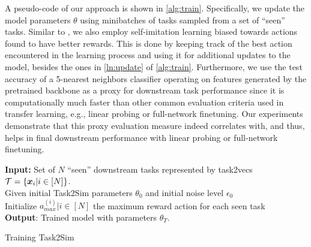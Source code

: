 A pseudo-code of our approach is shown in \cref{alg:train}.  Specifically, we update the model parameters $\theta$ using minibatches of tasks sampled from a set of ``seen'' tasks. Similar to \cite{oh2018self}, we also employ self-imitation learning biased towards actions found to have better rewards. This is done by keeping track of the best action encountered in the learning process and using it for additional updates to the model, besides the ones in \cref{ln:update} of \cref{alg:train}. 
Furthermore, we use the test accuracy of a 5-nearest neighbors classifier operating on features generated by the pretrained backbone as a proxy for downstream task performance since it is computationally much faster than other common evaluation criteria used in transfer learning, e.g., linear probing or full-network finetuning. Our experiments demonstrate that this proxy evaluation measure indeed correlates with, and thus, helps in final downstream performance with linear probing or full-network finetuning. 






\begin{algorithm}
\DontPrintSemicolon
 \textbf{Input:} Set of $N$ ``seen'' downstream tasks represented by task2vecs $\mathcal{T} = \{\boldsymbol{x}_i | i \in [N]\}$. \\
 Given initial Task2Sim parameters $\theta_0$ and initial noise level $\epsilon_0$\\
 Initialize $a_{max}^{(i)} | i \in [N]$ the maximum reward action for each seen task \\
 \textbf{Output}: Trained model with parameters $\theta_T$. 
 \caption{Training Task2Sim}
 \label{alg:train}  
\end{algorithm}
